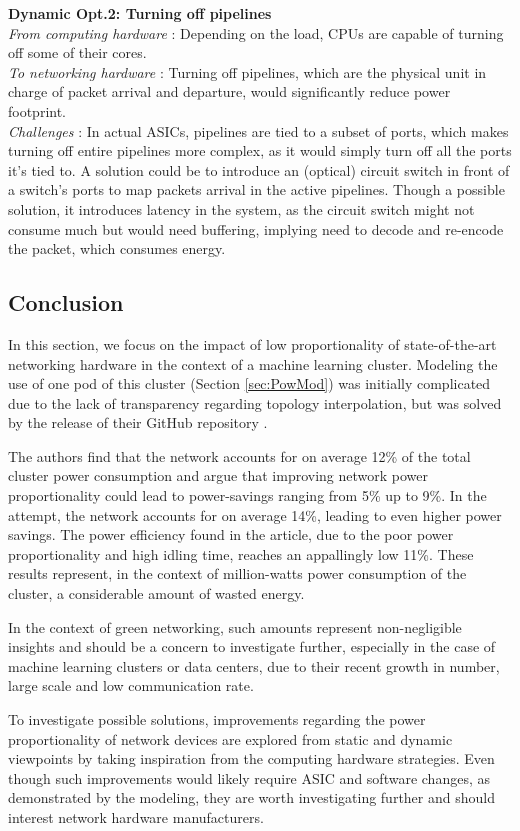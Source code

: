 \textbf{Dynamic Opt.2: Turning off pipelines}
\\\textit{From computing hardware} : Depending on the load, CPUs are capable of turning off some of their cores. 
\\\textit{To networking hardware} : Turning off pipelines, which are the physical unit in charge of packet arrival and departure, would significantly reduce power footprint. 
\\\textit{Challenges} : In actual ASICs, pipelines are tied to a subset of ports, which makes turning off entire pipelines more complex, as it would simply turn off all the ports it's tied to.
A solution could be to introduce an (optical) circuit switch in front of a switch's ports to map packets arrival in the active pipelines.
Though a possible solution, it introduces latency in the system, as the circuit switch might not consume much but would need buffering, implying need to decode and re-encode the packet, which consumes energy.

\subsection{Conclusion}
In this section, we focus on the impact of low proportionality of state-of-the-art networking hardware in the context of a machine learning cluster. 
Modeling the use of one pod of this cluster (Section \ref{sec:PowMod}) was initially complicated due to the lack of transparency regarding topology interpolation, but was solved by the release of their GitHub repository \cite{githubeNetPowProp}.

The authors find that the network accounts for on average 12\% of the total cluster power consumption and argue that improving network power proportionality could lead to power-savings ranging from 5\% up to 9\%.
In the attempt, the network accounts for on average 14\%, leading to even higher power savings.
The power efficiency found in the article, due to the poor power proportionality and high idling time, reaches an appallingly low 11\%.
These results represent, in the context of million-watts power consumption of the cluster, a considerable amount of wasted energy.

In the context of green networking, such amounts represent non-negligible insights and should be a concern to investigate further, especially in the case of machine learning clusters or data centers, due to their recent growth in number, large scale and low communication rate.  

To investigate possible solutions, improvements regarding the power proportionality of network devices are explored from static and dynamic viewpoints by taking inspiration from the computing hardware strategies.
Even though such improvements would likely require ASIC and software changes, as demonstrated by the modeling, they are worth investigating further and should interest network hardware manufacturers.  


